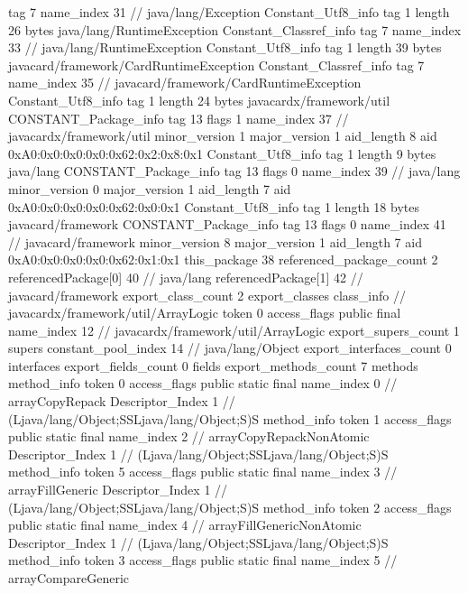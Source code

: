 {{{			tag	7
			name_index	31		// java/lang/Exception
		}
		Constant_Utf8_info {
			tag	1
			length	26
			bytes	java/lang/RuntimeException
		}
		Constant_Classref_info {
			tag	7
			name_index	33		// java/lang/RuntimeException
		}
		Constant_Utf8_info {
			tag	1
			length	39
			bytes	javacard/framework/CardRuntimeException
		}
		Constant_Classref_info {
			tag	7
			name_index	35		// javacard/framework/CardRuntimeException
		}
		Constant_Utf8_info {
			tag	1
			length	24
			bytes	javacardx/framework/util
		}
		CONSTANT_Package_info {
			tag	13
			flags	1
			name_index	37		// javacardx/framework/util
			minor_version	1
			major_version	1
			aid_length	8
			aid	0xA0:0x0:0x0:0x0:0x62:0x2:0x8:0x1
		}
		Constant_Utf8_info {
			tag	1
			length	9
			bytes	java/lang
		}
		CONSTANT_Package_info {
			tag	13
			flags	0
			name_index	39		// java/lang
			minor_version	0
			major_version	1
			aid_length	7
			aid	0xA0:0x0:0x0:0x0:0x62:0x0:0x1
		}
		Constant_Utf8_info {
			tag	1
			length	18
			bytes	javacard/framework
		}
		CONSTANT_Package_info {
			tag	13
			flags	0
			name_index	41		// javacard/framework
			minor_version	8
			major_version	1
			aid_length	7
			aid	0xA0:0x0:0x0:0x0:0x62:0x1:0x1
		}
	}
	this_package	38
	referenced_package_count	2
	referencedPackage[0]	40		// java/lang
	referencedPackage[1]	42		// javacard/framework
	export_class_count	2
	export_classes {
		class_info {		// javacardx/framework/util/ArrayLogic
			token	0
			access_flags	public final
			name_index	12		// javacardx/framework/util/ArrayLogic
			export_supers_count	1
			supers {
				constant_pool_index	14		// java/lang/Object
			}
			export_interfaces_count	0
			interfaces {
			}
			export_fields_count	0
			fields {
			}
			export_methods_count	7
			methods {
				method_info {
					token	0
					access_flags	public static final
					name_index	0		// arrayCopyRepack
					Descriptor_Index	1		// (Ljava/lang/Object;SSLjava/lang/Object;S)S
				}
				method_info {
					token	1
					access_flags	public static final
					name_index	2		// arrayCopyRepackNonAtomic
					Descriptor_Index	1		// (Ljava/lang/Object;SSLjava/lang/Object;S)S
				}
				method_info {
					token	5
					access_flags	public static final
					name_index	3		// arrayFillGeneric
					Descriptor_Index	1		// (Ljava/lang/Object;SSLjava/lang/Object;S)S
				}
				method_info {
					token	2
					access_flags	public static final
					name_index	4		// arrayFillGenericNonAtomic
					Descriptor_Index	1		// (Ljava/lang/Object;SSLjava/lang/Object;S)S
				}
				method_info {
					token	3
					access_flags	public static final
					name_index	5		// arrayCompareGeneric
}}}}}
